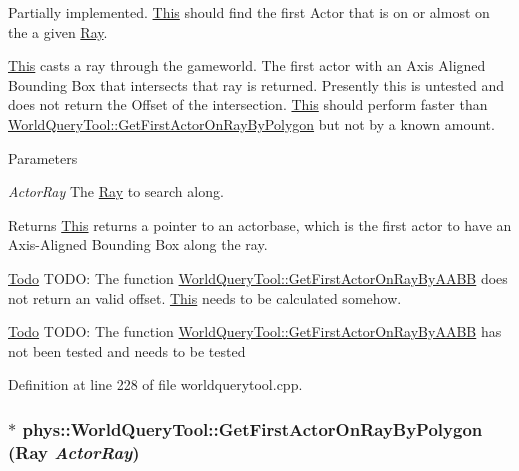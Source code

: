 Partially implemented. \hyperlink{structThis}{This} should find the first Actor that is on or almost on the a given \hyperlink{classphys_1_1Ray}{Ray}. 

\hyperlink{structThis}{This} casts a ray through the gameworld. The first actor with an Axis Aligned Bounding Box that intersects that ray is returned. Presently this is untested and does not return the Offset of the intersection. \hyperlink{structThis}{This} should perform faster than \hyperlink{classphys_1_1WorldQueryTool_a256022003d64756b0b5c5706aefd5139}{WorldQueryTool::GetFirstActorOnRayByPolygon} but not by a known amount. 
\begin{DoxyParams}{Parameters}
\item[{\em ActorRay}]The \hyperlink{classphys_1_1Ray}{Ray} to search along. \end{DoxyParams}
\begin{DoxyReturn}{Returns}
\hyperlink{structThis}{This} returns a pointer to an actorbase, which is the first actor to have an Axis-\/Aligned Bounding Box along the ray. 
\end{DoxyReturn}


\begin{Desc}
\item[\hyperlink{todo__todo000030}{Todo}]TODO: The function \hyperlink{classphys_1_1WorldQueryTool_a67575416c2e9c652bbd873649ee38baf}{WorldQueryTool::GetFirstActorOnRayByAABB} does not return an valid offset. \hyperlink{structThis}{This} needs to be calculated somehow. \end{Desc}
\begin{Desc}
\item[\hyperlink{todo__todo000031}{Todo}]TODO: The function \hyperlink{classphys_1_1WorldQueryTool_a67575416c2e9c652bbd873649ee38baf}{WorldQueryTool::GetFirstActorOnRayByAABB} has not been tested and needs to be tested \end{Desc}




Definition at line 228 of file worldquerytool.cpp.

\hypertarget{classphys_1_1WorldQueryTool_a256022003d64756b0b5c5706aefd5139}{
\subsubsection[{GetFirstActorOnRayByPolygon}]{ $\ast$ phys::WorldQueryTool::GetFirstActorOnRayByPolygon ({\bf Ray} {\em ActorRay})}}
\label{d8/d69/classphys_1_1WorldQueryTool_a256022003d64756b0b5c5706aefd5139}


